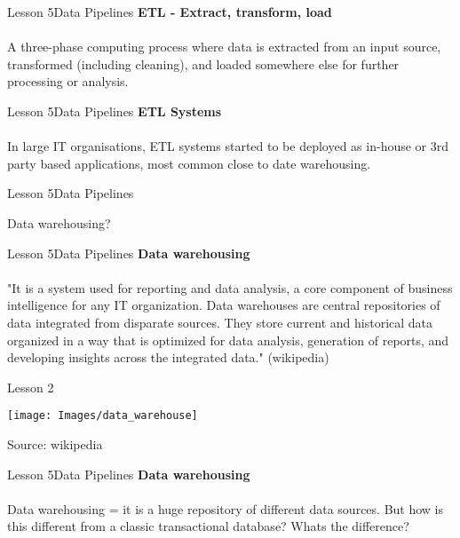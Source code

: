 \documentclass[aspectratio=1610]{beamer}
\begin{document}
\begin{frame}{Lesson 5}{Data Pipelines}
\LARGE
\textbf{ETL - Extract, transform, load}\\~\\
A three-phase computing process where data is extracted from an input source, 
transformed (including cleaning), and loaded somewhere else for further 
processing or analysis.
\end{frame}


\begin{frame}{Lesson 5}{Data Pipelines}
\LARGE
\textbf{ETL Systems}\\~\\
In large IT organisations, \alert{ETL systems} started to be deployed as 
in-house or 3rd party based applications, most common close to \alert{date 
warehousing}. 
\end{frame}



\begin{frame}{Lesson 5}{Data Pipelines}
\Huge
\begin{center}
Data warehousing?
\end{center}
\end{frame}


\begin{frame}{Lesson 5}{Data Pipelines}
\LARGE
\textbf{Data warehousing}\\~\\
"It is a system used for reporting and data analysis, a core component of 
business intelligence for any IT organization. Data warehouses are central 
repositories of data integrated from disparate sources. They store current and 
historical data organized in a way that is optimized for data analysis, 
generation of reports, and developing insights across the integrated data."
(wikipedia)
\end{frame}


\begin{frame}{Lesson 2}{}
\begin{center}
	\texttt{[image: Images/data\_warehouse]}
\end{center}
Source: wikipedia
\end{frame}



\begin{frame}{Lesson 5}{Data Pipelines}
\LARGE
\textbf{Data warehousing}\\~\\
Data warehousing = it is a huge repository of different data sources.
But how is this different from a classic transactional database? Whats the 
difference?
\end{frame}
\end{document}
